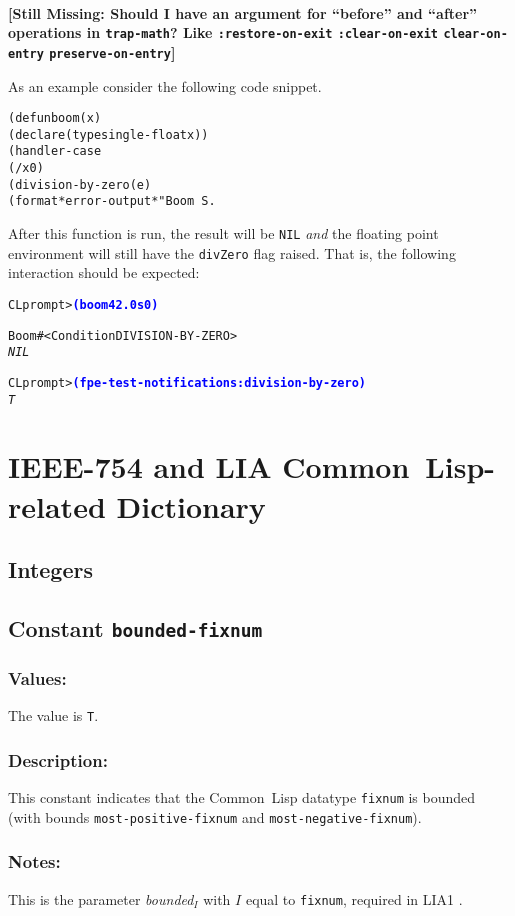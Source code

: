 \documentclass[10pt,fleqn]{article}
\newcommand{\CL}{\textsf{Common~Lisp}}
\newcommand{\missingpart}[1]{{\ }\vspace{2mm}\\
{\textbf{[Still Missing: #1]}}\\
\vspace{2mm}}
\newcommand{\code}[1]{\texttt{#1}}
\newcommand{\codeprompt}[1]{\textcolor{blue}{\textbf{#1}}}
\newcommand{\IEEEFPStd}{IEEE-754}
\newcommand{\DDictionaryItem}[1]{\vspace*{6pt}\noindent\hrulefill\vspace*{-9pt}\subsection*{#1}}
\newcommand{\DDescription}{\subsubsection*{Description:}}
\newcommand{\DNotes}{\subsubsection*{Notes:}}
\newcommand{\DValues}{\subsubsection*{Values:}}
\begin{document}
\missingpart{Should I have an argument for ``before'' and
  ``after'' operations in \code{trap-math}?  Like
  \code{:restore-on-exit} \code{:clear-on-exit} \code{clear-on-entry}
  \code{preserve-on-entry}}

\noindent
As an example consider the following code snippet.
\begin{alltt}
(defun boom (x)
    (declare (type single-float x))
    (handler-case 
        (/ x 0)
      (division-by-zero (e)
        (format *error-output* "Boom ~S.~%" e)))
\end{alltt}
After this function is run, the result will be \code{NIL} \emph{and} the
floating point environment will still have the \code{divZero} flag raised.
That is, the following interaction should be expected:
\begin{alltt}
CL prompt> \codeprompt{(boom 42.0s0)}

Boom #<Condition DIVISION-BY-ZERO>
\textit{NIL}

CL prompt> \codeprompt{(fpe-test-notifications :division-by-zero)}
\textit{T}
\end{alltt}


\newpage

\section{\IEEEFPStd{} and LIA \CL{}-related Dictionary}

\subsection{Integers}


\DDictionaryItem{Constant \code{bounded-fixnum}}
\index{B!\code{bounded-fixnum}}

\DValues{}

The value is \code{T}.

\DDescription{}

This constant indicates that the \CL{} datatype \code{fixnum} is
bounded (with bounds \code{most-positive-fixnum} and
\code{most-negative-fixnum}).

\DNotes{}

This is the parameter \textit{bounded}$_I$ with $I$ equal to
\code{fixnum}, required in LIA1 \cite{2012:LIA1}.
\end{document}
